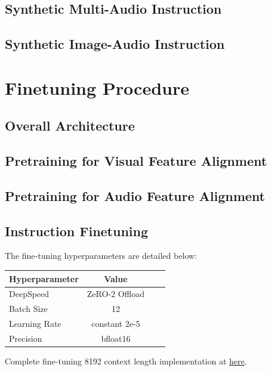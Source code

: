 \documentclass[preprint]{article}
\begin{document}
\subsection{Synthetic Multi-Audio Instruction}

\subsection{Synthetic Image-Audio Instruction}

\section{Finetuning Procedure}

\subsection{Overall Architecture}

\subsection{Pretraining for Visual Feature Alignment}

\subsection{Pretraining for Audio Feature Alignment}

\subsection{Instruction Finetuning}

The fine-tuning hyperparameters are detailed below:

\begin{table}[h]
  \centering
  \begin{tabular}{lccl}
    \hline
    \textbf{Hyperparameter} & \textbf{Value} \\
    \hline
    DeepSpeed               & ZeRO-2 Offload \\
    Batch Size              & 12             \\
    Learning Rate           & constant 2e-5  \\
    Precision               & bfloat16       \\
    \hline
  \end{tabular}
\end{table}

Complete fine-tuning 8192 context length implementation at \href{https://github.com/mesolitica/multimodal-LLM/blob/master/run-deepspeed.sh}{here}.
\end{document}

